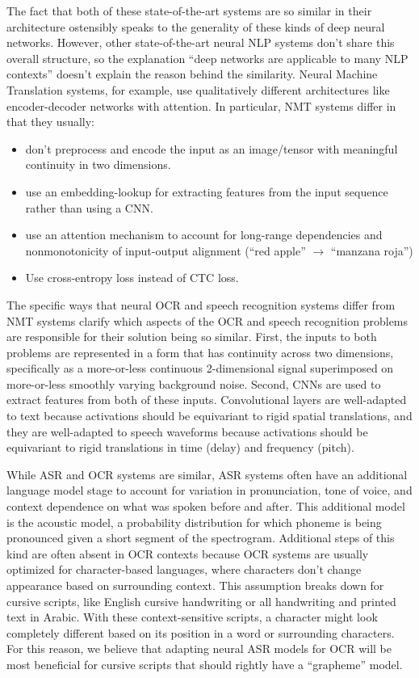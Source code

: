 \documentclass{article}
\begin{document}
The fact that both of these state-of-the-art systems are so similar in their
architecture ostensibly speaks to the generality of these kinds of deep neural
networks. However, other state-of-the-art neural NLP systems don't share this
overall structure, so the explanation ``deep networks are applicable to many NLP
contexts'' doesn't explain the reason behind the similarity. Neural Machine
Translation systems, for example, use qualitatively different architectures like
encoder-decoder networks with attention. In particular, NMT systems differ in
that they usually:
\begin{itemize}
\item don't preprocess and encode the input as an image/tensor with meaningful
  continuity in two dimensions.
\item use an embedding-lookup for extracting features from the input sequence
  rather than using a CNN.
\item use an attention mechanism to account for long-range dependencies and
  nonmonotonicity of input-output alignment (``red apple'' $\rightarrow$
  ``manzana roja'')
\item Use cross-entropy loss instead of CTC loss.
\end{itemize}

The specific ways that neural OCR and speech recognition systems differ from NMT
systems clarify which aspects of the OCR and speech recognition problems are
responsible for their solution being so similar. First, the inputs to both
problems are represented in a form that has continuity across two dimensions,
specifically as a more-or-less continuous 2-dimensional signal superimposed on
more-or-less smoothly varying background noise. Second, CNNs are used to extract
features from both of these inputs. Convolutional layers are well-adapted to
text because activations should be equivariant to rigid spatial translations,
and they are well-adapted to speech waveforms because activations should be
equivariant to rigid translations in time (delay) and frequency (pitch).

While ASR and OCR systems are similar, ASR systems often have an additional
language model stage to account for variation in pronunciation, tone of voice,
and context dependence on what was spoken before and after. This additional
model is the acoustic model, a probability distribution for which phoneme is
being pronounced given a short segment of the spectrogram. Additional steps of
this kind are often absent in OCR contexts because OCR systems are usually
optimized for character-based languages, where characters don't change
appearance based on surrounding context. This assumption breaks down for cursive
scripts, like English cursive handwriting or all handwriting and printed text in
Arabic. With these context-sensitive scripts, a character might look completely
different based on its position in a word or surrounding characters. For this
reason, we believe that adapting neural ASR models for OCR will be most
beneficial for cursive scripts that should rightly have a ``grapheme'' model.
\end{document}
